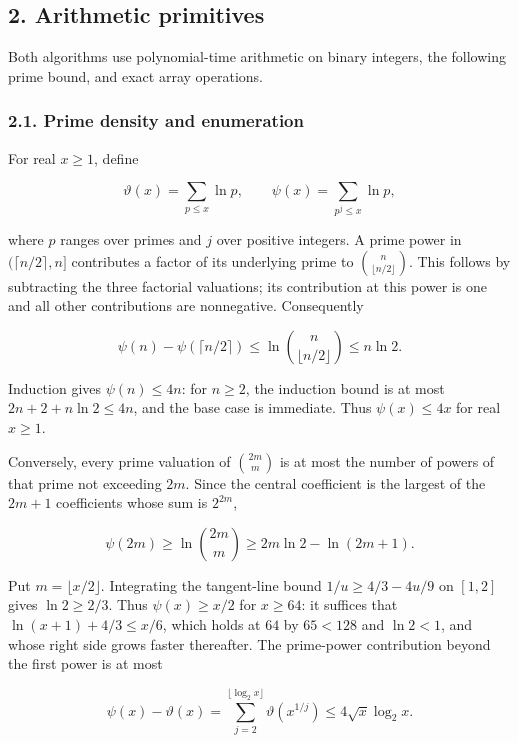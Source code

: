 \hypertarget{af-a9ec399514-arithmetic-primitives}{%
\subsection{2. Arithmetic primitives}\label{af-a9ec399514-arithmetic-primitives}}

Both algorithms use polynomial-time arithmetic on binary integers, the following prime bound, and exact array operations.

\hypertarget{af-a9ec399514-prime-density-and-enumeration}{%
\subsubsection{2.1. Prime density and enumeration}\label{af-a9ec399514-prime-density-and-enumeration}}

For real \(x\geq1\), define

\[
\vartheta(x)=\sum_{p\leq x}\ln p,\qquad
\psi(x)=\sum_{p^j\leq x}\ln p,
\]

where \(p\) ranges over primes and \(j\) over positive integers. A prime power in \((\lceil n/2\rceil,n]\) contributes a factor of its underlying prime to \(\binom n{\lfloor n/2\rfloor}\). This follows by subtracting the three factorial valuations; its contribution at this power is one and all other contributions are nonnegative. Consequently

\[
\psi(n)-\psi(\lceil n/2\rceil)
\leq\ln\binom n{\lfloor n/2\rfloor}\leq n\ln2.
\]

Induction gives \(\psi(n)\leq4n\): for \(n\geq2\), the induction bound is at most \(2n+2+n\ln2\leq4n\), and the base case is immediate. Thus \(\psi(x)\leq4x\) for real \(x\geq1\).

Conversely, every prime valuation of \(\binom{2m}m\) is at most the number of powers of that prime not exceeding \(2m\). Since the central coefficient is the largest of the \(2m+1\) coefficients whose sum is \(2^{2m}\),

\[
\psi(2m)\geq\ln\binom{2m}m
\geq2m\ln2-\ln(2m+1).
\]

Put \(m=\lfloor x/2\rfloor\). Integrating the tangent-line bound \(1/u\geq4/3-4u/9\) on \([1,2]\) gives \(\ln2\geq2/3\). Thus \(\psi(x)\geq x/2\) for \(x\geq64\): it suffices that \(\ln(x+1)+4/3\leq x/6\), which holds at \(64\) by \(65<128\) and \(\ln2<1\), and whose right side grows faster thereafter. The prime-power contribution beyond the first power is at most

\[
\psi(x)-\vartheta(x)
=\sum_{j=2}^{\lfloor\log_2x\rfloor}\vartheta(x^{1/j})
\leq4\sqrt{x}\log_2x.
\]

